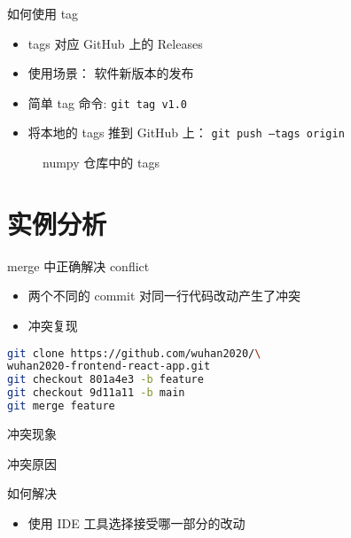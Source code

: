 \documentclass[notheorems,xetex]{beamer}
\begin{document}
\begin{frame}{如何使用 tag}
\begin{itemize}
	\item tags 对应 GitHub 上的 Releases
	\item 使用场景： 软件新版本的发布
	\item 简单 tag 命令: \texttt{git tag v1.0}
	\item 将本地的 tags 推到 GitHub 上： \texttt{git push --tags origin}
\end{itemize}
\begin{figure}
	\caption{numpy 仓库中的 tags}
\end{figure}
\end{frame}
\section{实例分析}
\frame{\tableofcontents[currentsection]}
\begin{frame}[fragile]{merge 中正确解决 conflict}
\begin{itemize}
\item 两个不同的 commit 对同一行代码改动产生了冲突
     \begin{figure}
	\centering
	\end{figure}
\item 冲突复现
\end{itemize}
\begin{lstlisting}[language=bash]
git clone https://github.com/wuhan2020/\
wuhan2020-frontend-react-app.git
git checkout 801a4e3 -b feature
git checkout 9d11a11 -b main
git merge feature
\end{lstlisting}

\end{frame}
\begin{frame}{冲突现象}

\begin{figure}
	\centering
\end{figure}
\end{frame}
\begin{frame}{冲突原因}
\begin{figure}
	\centering
\end{figure}
\end{frame}
\begin{frame}{如何解决}
\begin{itemize}
	\item 使用 IDE 工具选择接受哪一部分的改动
\end{itemize}
\begin{figure}
\end{figure}

\end{frame}
\end{document}
